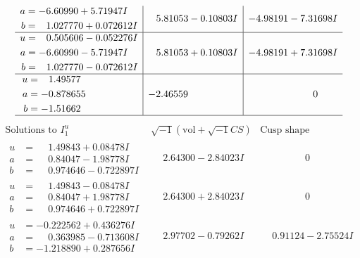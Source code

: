 \documentclass[1p]{elsarticle_modified}
\theoremstyle{definition}
\newcommand{\I}{\sqrt{-1}}
\begin{document}
$$\begin{array}{c|c|c}
\begin{aligned}
a &= -6.60990 + 5.71947 I \\
b &= \phantom{-}1.027770 + 0.072612 I\end{aligned}
 & \phantom{-}5.81053 - 0.10803 I & -4.98191 - 7.31698 I \\ \hline\begin{aligned}
u &= \phantom{-}0.505606 - 0.052276 I \\
a &= -6.60990 - 5.71947 I \\
b &= \phantom{-}1.027770 - 0.072612 I\end{aligned}
 & \phantom{-}5.81053 + 0.10803 I & -4.98191 + 7.31698 I \\ \hline\begin{aligned}
u &= \phantom{-}1.49577\phantom{ +0.000000I} \\
a &= -0.878655\phantom{ +0.000000I} \\
b &= -1.51662\phantom{ +0.000000I}\end{aligned}
 & -2.46559\phantom{ +0.000000I} & \phantom{-0.000000 } 0\\
 \hline 
 \end{array}$$\newpage$$\begin{array}{c|c|c}  
\text{Solutions to }I^u_{1}& \I (\text{vol} + \sqrt{-1}CS) & \text{Cusp shape}\\
 \hline 
\begin{aligned}
u &= \phantom{-}1.49843 + 0.08478 I \\
a &= \phantom{-}0.84047 - 1.98778 I \\
b &= \phantom{-}0.974646 - 0.722897 I\end{aligned}
 & \phantom{-}2.64300 - 2.84023 I & \phantom{-0.000000 } 0 \\ \hline\begin{aligned}
u &= \phantom{-}1.49843 - 0.08478 I \\
a &= \phantom{-}0.84047 + 1.98778 I \\
b &= \phantom{-}0.974646 + 0.722897 I\end{aligned}
 & \phantom{-}2.64300 + 2.84023 I & \phantom{-0.000000 } 0 \\ \hline\begin{aligned}
u &= -0.222562 + 0.436276 I \\
a &= \phantom{-}0.363985 - 0.713608 I \\
b &= -1.218890 + 0.287656 I\end{aligned}
 & \phantom{-}2.97702 - 0.79262 I & \phantom{-}0.91124 - 2.75524 I \\ \hline\begin{aligned}

\end{aligned}
\end{array}$$
\end{document}
